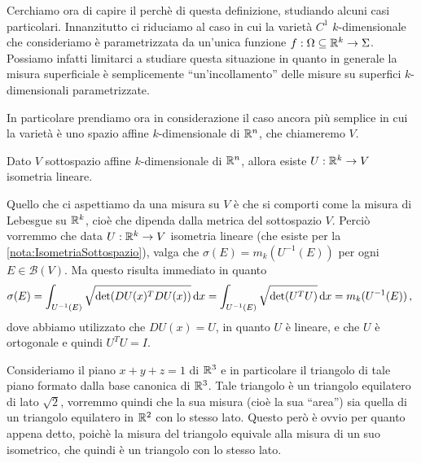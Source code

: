 Cerchiamo ora di capire il perchè di questa definizione, studiando alcuni casi particolari. Innanzitutto ci riduciamo al caso in cui la varietà $C^1$ $k$-dimensionale che consideriamo è parametrizzata da un'unica funzione $f:\Omega\subseteq \mathbb R^k\to\Sigma$. Possiamo infatti limitarci a studiare questa situazione in quanto in generale la misura superficiale è semplicemente ``un'incollamento'' delle misure su superfici $k$-dimensionali parametrizzate. 

In particolare prendiamo ora in considerazione il caso ancora più semplice in cui la varietà è uno spazio affine $k$-dimensionale di $\mathbb R^n$, che chiameremo $V$.

\begin{remark}\label{nota:IsometriaSottospazio}
	Dato $V$ sottospazio affine $k$-dimensionale di $\mathbb R^n$, allora esiste $U:\mathbb R^k\to V$ isometria lineare.
\end{remark}

Quello che ci aspettiamo da una misura su $V$ è che si comporti come la misura di Lebesgue su $\mathbb R^k$, cioè che dipenda dalla metrica del sottospazio $V$. Perciò vorremmo che data $U:\mathbb R^k\to V$ isometria lineare (che esiste per la \cref{nota:IsometriaSottospazio}), valga che $\sigma(E)=m_k(U^{-1}(E))$ per ogni $E\in\mathcal{B}(V)$. Ma questo risulta immediato in quanto
\begin{equation*}
	\sigma(E)=\int_{U^{-1}(E)}\sqrt{\det(DU(x)^TDU(x))}\,\mathrm d x=\int_{U^{-1}(E)}\sqrt{\det(U^TU)}\,\mathrm d x=m_k(U^{-1}(E))\, \text{, }
\end{equation*}
dove abbiamo utilizzato che $DU(x)=U$, in quanto $U$ è lineare, e che $U$ è ortogonale e quindi $U^TU=I$.

\begin{example}
	Consideriamo il piano $x+y+z=1$ di $\mathbb R^3$ e in particolare il triangolo di tale piano formato dalla base canonica di $\mathbb R^3$. Tale triangolo è un triangolo equilatero di lato $\sqrt{2}$, vorremmo quindi che la sua misura (cioè la sua ``area'') sia quella di un triangolo equilatero in $\mathbb R^2$ con lo stesso lato. Questo però è ovvio per quanto appena detto, poichè la misura del triangolo equivale alla misura di un suo isometrico, che quindi è un triangolo con lo stesso lato.
\end{example}
